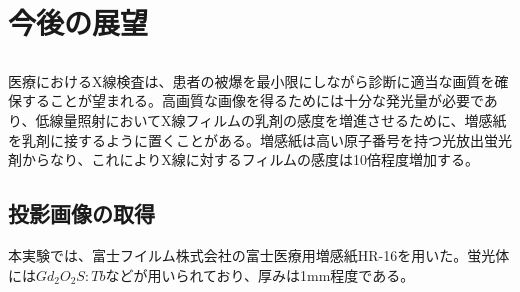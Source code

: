\documentclass[12pt]{jreport}
\begin{document}
\setcounter{topnumber}{10} %
\setcounter{bottomnumber}{10} %
\setcounter{totalnumber}{10} \dag%
\setcounter{dbltopnumber}{10} %
\renewcommand\topfraction{0.8} %
\renewcommand\bottomfraction{0.8} %
\renewcommand\textfraction{0.05} %
\renewcommand\floatpagefraction{0.8} %
\renewcommand\dbltopfraction{0.8} %
\renewcommand\dblfloatpagefraction{0.8} %

\chapter{今後の展望}
\section{}
医療におけるX線検査は、患者の被爆を最小限にしながら診断に適当な画質を確保することが望まれる。高画質な画像を得るためには十分な発光量が必要であり、低線量照射においてX線フィルムの乳剤の感度を増進させるために、増感紙を乳剤に接するように置くことがある。増感紙は高い原子番号を持つ光放出蛍光剤からなり、これによりX線に対するフィルムの感度は10倍程度増加する。

\section{投影画像の取得}
本実験では、富士フイルム株式会社の富士医療用増感紙HR-16を用いた。蛍光体には$Gd_{2}O_{2}S:Tb$などが用いられており、厚みは1mm程度である。
\end{document}
